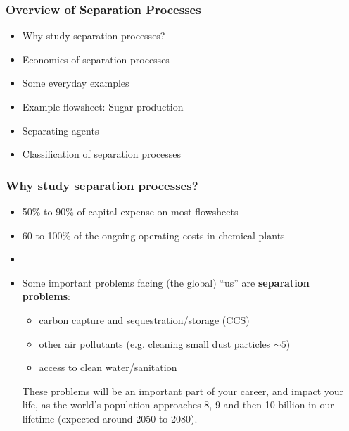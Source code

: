
\begin{frame}\frametitle{Overview of Separation Processes}
	
	\begin{itemize}
		\item	Why study separation processes?
		\item	Economics of separation processes
		\item	Some everyday examples
		\item	Example flowsheet: Sugar production
		\item	Separating agents
		\item	Classification of separation processes		
	\end{itemize}
\end{frame}

\begin{frame}\frametitle{Why study separation processes?}
	\begin{itemize}
		\item	50\% to 90\% of capital expense on most flowsheets
		\item	60 to 100\% of the ongoing operating costs in chemical plants
		\item	{}
		\item	Some important problems facing (the global) ``us'' are \textbf{separation problems}:
		\begin{itemize}
			\item	carbon capture and sequestration/storage (CCS)
			\item	other air pollutants (e.g. cleaning small dust particles $\sim 5$\micron)
			\item	access to clean water/sanitation
		\end{itemize}
		
		\begin{exampleblock}{}
			These problems will be an important part of your career, and impact your life, as the world's population approaches 8, 9 and then 10 billion in our lifetime (expected around 2050 to 2080).
		\end{exampleblock}		
		
	\end{itemize}
\end{frame}

\begin{frame}\frametitle{World population: UN projections}
	\begin{center}
		\texttt{[image: \\imagedir/teaching/\{World-Population-1800-2100.png]}}
	\end{center}
\end{frame}

